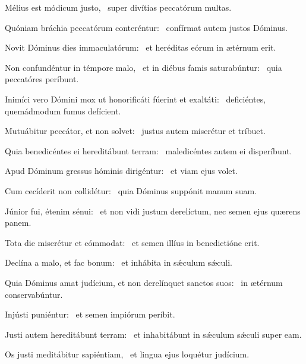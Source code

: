 \item Mélius est módicum justo,~\psstar{} super divítias peccatórum multas.

\item Quóniam bráchia peccatórum conteréntur:~\psstar{} confírmat autem justos Dóminus.

\item Novit Dóminus dies immaculatórum:~\psstar{} et heréditas eórum in ætérnum erit.

\item Non confundéntur in témpore malo,~\pscross{} et in diébus famis saturabúntur:~\psstar{} quia peccatóres períbunt.

\item Inimíci vero Dómini mox ut honorificáti fúerint et exaltáti:~\psstar{} deficiéntes, quemádmodum fumus defícient.

\item Mutuábitur peccátor, et non solvet:~\psstar{} justus autem miserétur et tríbuet.

\item Quia benedicéntes ei hereditábunt terram:~\psstar{} maledicéntes autem ei disperíbunt.

\item Apud Dóminum gressus hóminis dirigéntur:~\psstar{} et viam ejus volet.

\item Cum cecíderit non collidétur:~\psstar{} quia Dóminus suppónit manum suam.

\item Júnior fui, étenim sénui:~\psstar{} et non vidi justum derelíctum, nec semen ejus quærens panem.

\item Tota die miserétur et cómmodat:~\psstar{} et semen illíus in benedictióne erit.

\item Declína a malo, et fac bonum:~\psstar{} et inhábita in sǽculum sǽculi.

\item Quia Dóminus amat judícium, et non derelínquet sanctos suos:~\psstar{} in ætérnum conservabúntur.

\item Injústi puniéntur:~\psstar{} et semen impiórum períbit.

\item Justi autem hereditábunt terram:~\psstar{} et inhabitábunt in sǽculum sǽculi super eam.

\item Os justi meditábitur sapiéntiam,~\psstar{} et lingua ejus loquétur judícium.

